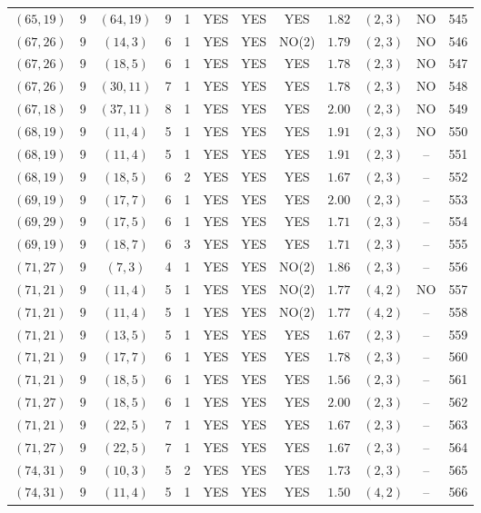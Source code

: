 \begin{longtable}{|c|c|c|c|c|c|c|c|c|c|c|c|}
$(65,19)$ & 9 & $(64,19)$ & 9 & 1 & YES & YES & YES & $1.82$ & $(2,3)$ & NO & 545\\
$(67,26)$ & 9 & $(14,3)$ & 6 & 1 & YES & YES & NO(2) & $1.79$ & $(2,3)$ & NO & 546\\
$(67,26)$ & 9 & $(18,5)$ & 6 & 1 & YES & YES & YES & $1.78$ & $(2,3)$ & NO & 547\\
$(67,26)$ & 9 & $(30,11)$ & 7 & 1 & YES & YES & YES & $1.78$ & $(2,3)$ & NO & 548\\
$(67,18)$ & 9 & $(37,11)$ & 8 & 1 & YES & YES & YES & $2.00$ & $(2,3)$ & NO & 549\\
$(68,19)$ & 9 & $(11,4)$ & 5 & 1 & YES & YES & YES & $1.91$ & $(2,3)$ & NO & 550\\
$(68,19)$ & 9 & $(11,4)$ & 5 & 1 & YES & YES & YES & $1.91$ & $(2,3)$ & -- & 551\\
$(68,19)$ & 9 & $(18,5)$ & 6 & 2 & YES & YES & YES & $1.67$ & $(2,3)$ & -- & 552\\
$(69,19)$ & 9 & $(17,7)$ & 6 & 1 & YES & YES & YES & $2.00$ & $(2,3)$ & -- & 553\\
$(69,29)$ & 9 & $(17,5)$ & 6 & 1 & YES & YES & YES & $1.71$ & $(2,3)$ & -- & 554\\
$(69,19)$ & 9 & $(18,7)$ & 6 & 3 & YES & YES & YES & $1.71$ & $(2,3)$ & -- & 555\\
$(71,27)$ & 9 & $(7,3)$ & 4 & 1 & YES & YES & NO(2) & $1.86$ & $(2,3)$ & -- & 556\\
$(71,21)$ & 9 & $(11,4)$ & 5 & 1 & YES & YES & NO(2) & $1.77$ & $(4,2)$ & NO & 557\\
$(71,21)$ & 9 & $(11,4)$ & 5 & 1 & YES & YES & NO(2) & $1.77$ & $(4,2)$ & -- & 558\\
$(71,21)$ & 9 & $(13,5)$ & 5 & 1 & YES & YES & YES & $1.67$ & $(2,3)$ & -- & 559\\
$(71,21)$ & 9 & $(17,7)$ & 6 & 1 & YES & YES & YES & $1.78$ & $(2,3)$ & -- & 560\\
$(71,21)$ & 9 & $(18,5)$ & 6 & 1 & YES & YES & YES & $1.56$ & $(2,3)$ & -- & 561\\
$(71,27)$ & 9 & $(18,5)$ & 6 & 1 & YES & YES & YES & $2.00$ & $(2,3)$ & -- & 562\\
$(71,21)$ & 9 & $(22,5)$ & 7 & 1 & YES & YES & YES & $1.67$ & $(2,3)$ & -- & 563\\
$(71,27)$ & 9 & $(22,5)$ & 7 & 1 & YES & YES & YES & $1.67$ & $(2,3)$ & -- & 564\\
$(74,31)$ & 9 & $(10,3)$ & 5 & 2 & YES & YES & YES & $1.73$ & $(2,3)$ & -- & 565\\
$(74,31)$ & 9 & $(11,4)$ & 5 & 1 & YES & YES & YES & $1.50$ & $(4,2)$ & -- & 566\\

\end{longtable}
